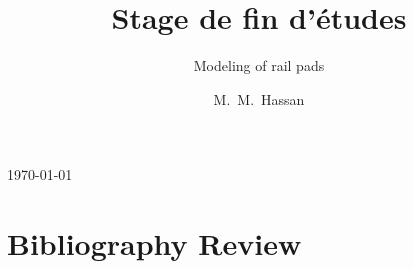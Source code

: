 


\graphicspath{{plots/}}



\title[Stage]{Stage de fin d'études}
\subtitle{Modeling of rail pads}
\author[Hassan,Van]{M.~M.~Hassan} 


\today


\frame{\titlepage}
\section[Biblio]{Bibliography Review}

\begin{environment}
    
\end{environment}











